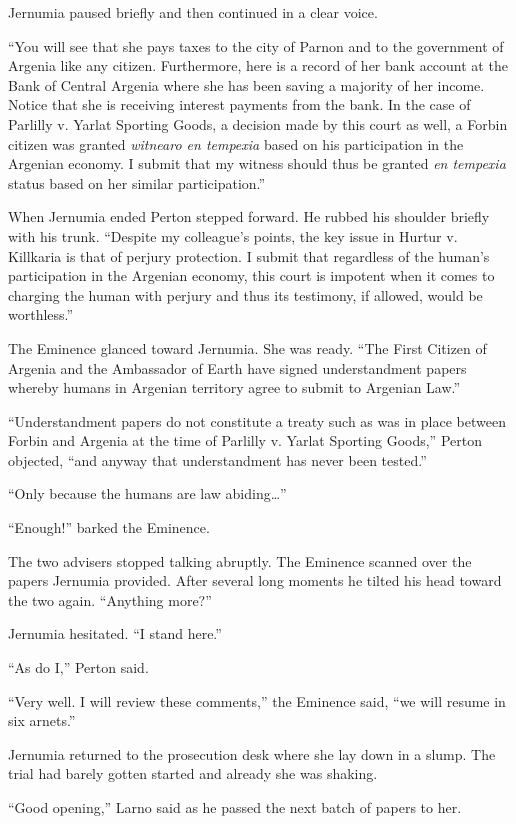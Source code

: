 Jernumia paused briefly and then continued in a clear voice.

``You will see that she pays taxes to the city of Parnon and to the government of Argenia like
any citizen. Furthermore, here is a record of her bank account at the Bank of Central Argenia
where she has been saving a majority of her income. Notice that she is receiving interest
payments from the bank. In the case of Parlilly v. Yarlat Sporting Goods, a decision made by
this court as well, a Forbin citizen was granted \textit{witnearo en tempexia} based on his
participation in the Argenian economy. I submit that my witness should thus be granted
\textit{en tempexia} status based on her similar participation.''

When Jernumia ended Perton stepped forward. He rubbed his shoulder briefly with his trunk.
``Despite my colleague's points, the key issue in Hurtur v. Killkaria is that of perjury
protection. I submit that regardless of the human's participation in the Argenian economy, this
court is impotent when it comes to charging the human with perjury and thus its testimony, if
allowed, would be worthless.''

The Eminence glanced toward Jernumia. She was ready. ``The First Citizen of Argenia and the
Ambassador of Earth have signed understandment papers whereby humans in Argenian territory agree
to submit to Argenian Law.''

``Understandment papers do not constitute a treaty such as was in place between Forbin and
Argenia at the time of Parlilly v. Yarlat Sporting Goods,'' Perton objected, ``and anyway that
understandment has never been tested.''

``Only because the humans are law abiding\ldots''

``Enough!'' barked the Eminence.

The two advisers stopped talking abruptly. The Eminence scanned over the papers Jernumia
provided. After several long moments he tilted his head toward the two again. ``Anything more?''

Jernumia hesitated. ``I stand here.''

``As do I,'' Perton said.

``Very well. I will review these comments,'' the Eminence said, ``we will resume in six
arnets.''

Jernumia returned to the prosecution desk where she lay down in a slump. The trial had barely
gotten started and already she was shaking.

``Good opening,'' Larno said as he passed the next batch of papers to her.

